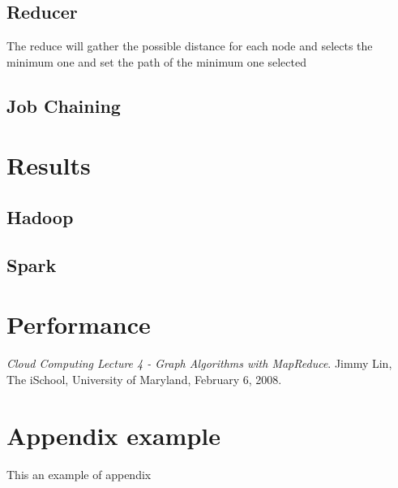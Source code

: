 \documentclass[english]{article}
\begin{document}
\newpage
\subsection{Reducer}
The reduce will gather the possible distance for each node and selects the minimum one and set the path of the minimum one selected

\subsection{Job Chaining}

\section{Results}

\subsection{Hadoop}

\subsection{Spark}

\section{Performance}

\newpage

\begin{thebibliography}{9}
 \textit{Cloud Computing Lecture 4 - Graph Algorithms with MapReduce}. Jimmy Lin, The iSchool, University of Maryland, February 6, 2008.
\end{thebibliography}
\newpage
\appendix
\section{Appendix example}
This an example of appendix
\end{document}
